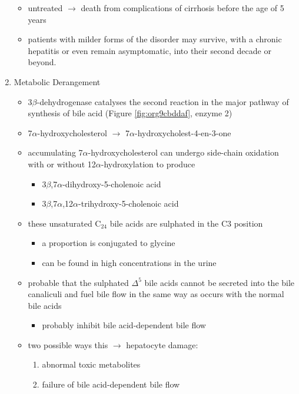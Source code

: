 \documentclass{scrartcl}
\begin{document}
\begin{enumerate}
\begin{itemize}
\item untreated \(\to\) death from complications of cirrhosis before the age
of 5 years
\item patients with milder forms of the disorder may survive, with a
chronic hepatitis or even remain asymptomatic, into their second
decade or beyond.
\end{itemize}
\item Metabolic Derangement
\label{sec:org0aafcee}
\begin{itemize}
\item 3\(\beta\)-dehydrogenase catalyses the second reaction in the major
pathway of synthesis of bile acid (Figure \ref{fig:org9cbddaf}, enzyme 2)
\item 7\(\alpha\)-hydroxycholesterol \(\to\) 7\(\alpha\)-hydroxycholest-4-en-3-one
\item accumulating 7\(\alpha\)-hydroxycholesterol can undergo side-chain
oxidation with or without 12\(\alpha\)-hydroxylation to produce
\begin{itemize}
\item 3\(\beta\),7\(\alpha\)-dihydroxy-5-cholenoic acid
\item 3\(\beta\),7\(\alpha\),12\(\alpha\)-trihydroxy-5-cholenoic acid
\end{itemize}
\item these unsaturated C\(_{\text{24}}\) bile acids are sulphated in the C3 position
\begin{itemize}
\item a proportion is conjugated to glycine
\item can be found in high concentrations in the urine
\end{itemize}
\item probable that the sulphated \(\Delta^{\text{5}}\) bile acids cannot be secreted
into the bile canaliculi and fuel bile flow in the same way as
occurs with the normal bile acids
\begin{itemize}
\item probably inhibit bile acid-dependent bile flow
\end{itemize}
\item two possible ways this \(\to\) hepatocyte damage:
\begin{enumerate}
\item abnormal toxic metabolites
\item failure of bile acid-dependent bile flow
\end{enumerate}
\end{itemize}


\end{enumerate}
\end{document}
